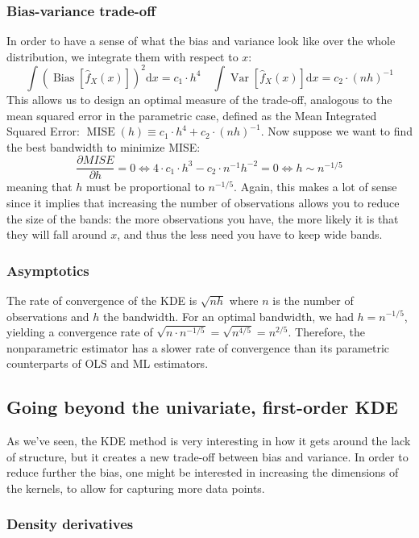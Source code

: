 \documentclass[12pt]{report}
\def\D{\mathrm{d}}
\newcommand{\V}[1]{\operatorname{Var}\left[#1\right]}
\def\D{\mathrm{d}}
\def\D{\mathrm{d}}
\begin{document}
\subsubsection{Bias-variance trade-off}

In order to have a sense of what the bias and variance look like over the whole distribution, we integrate them with respect to $x$: $$\int \left(\operatorname{Bias}\left[\hat f_X(x)\right]\right)^2 \D x = c_1 \cdot h^4 \quad \int \V{\hat f_X(x)} \D x = c_2 \cdot (nh)^{-1} $$ This allows us to design an optimal measure of the trade-off, analogous to the mean squared error in the parametric case, defined as the Mean Integrated Squared Error: $\operatorname{MISE}(h) \equiv c_1 \cdot h^4 + c_2 \cdot (nh)^{-1} $. Now suppose we want to find the best bandwidth to minimize MISE: $$\frac{\partial MISE}{\partial h} = 0 \Leftrightarrow 4\cdot c_1\cdot h^3 - c_2\cdot n^{-1} h^{-2} = 0 \Leftrightarrow h \sim n^{-1/5} $$ meaning that $h$ must be proportional to $n^{-1/5}$. Again, this makes a lot of sense since it implies that increasing the number of observations allows you to reduce the size of the bands: the more observations you have, the more likely it is that they will fall around $x$, and thus the less need you have to keep wide bands.

\subsubsection{Asymptotics}

The rate of convergence of the KDE is $\sqrt{nh}$ where $n$ is the number of observations and $h$ the bandwidth. For an optimal bandwidth, we had $h = n^{-1/5}$, yielding a convergence rate of $\sqrt{n\cdot n^{-1/5}} = \sqrt{n^{4/5}} = n^{2/5}$. Therefore, the nonparametric estimator has a slower rate of convergence than its parametric counterparts of OLS and ML estimators.

\subsection{Going beyond the univariate, first-order KDE}

As we've seen, the KDE method is very interesting in how it gets around the lack of structure, but it creates a new trade-off between bias and variance. In order to reduce further the bias, one might be interested in increasing the dimensions of the kernels, to allow for capturing more data points.

\subsubsection{Density derivatives}
\end{document}
